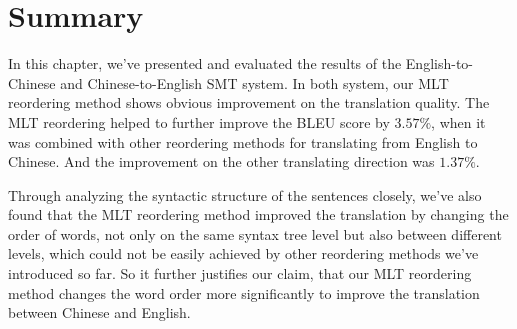 \section{Summary}
\label{ch:Evaluation:sec:Conclusion}

In this chapter, we've presented and evaluated the results of the English-to-Chinese and Chinese-to-English SMT system. In both system, our MLT reordering method shows obvious improvement on the translation quality. The MLT reordering helped to further improve the BLEU score by $3.57\%$, when it was combined with other reordering methods for translating from English to Chinese. And the improvement on the other translating direction was $1.37\%$.

Through analyzing the syntactic structure of the sentences closely, we've also found that the MLT reordering method improved the translation by changing the order of words, not only on the same syntax tree level but also between different levels, which could not be easily achieved by other reordering methods we've introduced so far. So it further justifies our claim, that our MLT reordering method changes the word order more significantly to improve the translation between Chinese and English.
